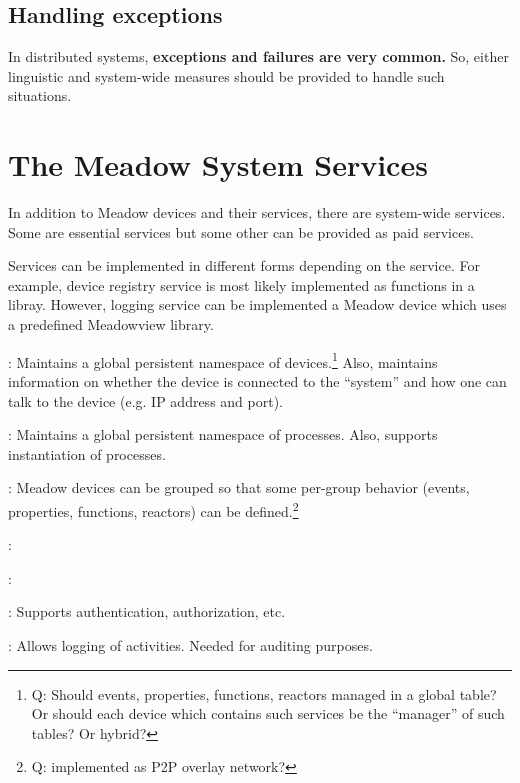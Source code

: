 \documentclass{note}
\begin{document}
{\subsection{Handling exceptions}
In distributed systems, \textcolor{blue2}{\bf exceptions and failures are very
  common.} So, either linguistic and system-wide measures should be provided
to handle such situations. 


\section{The Meadow System Services}
In addition to Meadow devices and their services, there are 
system-wide services. Some are essential services but some other can be
provided as paid services.

Services can be implemented in different forms depending on the service.
For example, device registry service  is most likely implemented as functions
in a libray. However, logging service can be implemented a Meadow device which
uses a predefined Meadowview library.


\bit
\w \textcolor{blue2}{}: 
   Maintains a global persistent namespace of devices.\footnote{\textcolor{green2}{Q: Should events, properties, functions, reactors
     managed in a global table? Or should each device which contains such
     services be the ``manager'' of such tables? Or hybrid?}}
   Also, maintains information on whether the device is connected to the
   ``system'' and how one can talk to the device (e.g. IP address and port).

\w \textcolor{blue2}{}:
   Maintains a global persistent namespace of processes. 
   Also, supports instantiation of processes.

\w \textcolor{blue2}{}:
   Meadow devices can be grouped so that some per-group behavior (events,
   properties, functions, reactors) can be defined.\footnote{\textcolor{green2}{Q: implemented as P2P overlay network?}}

\w \textcolor{blue2}{}:

\w \textcolor{blue2}{}:

\w \textcolor{blue2}{}:
  Supports authentication, authorization, etc.

\w \textcolor{blue2}{}:
  Allows logging of activities. Needed for auditing purposes.

}
\end{document}
